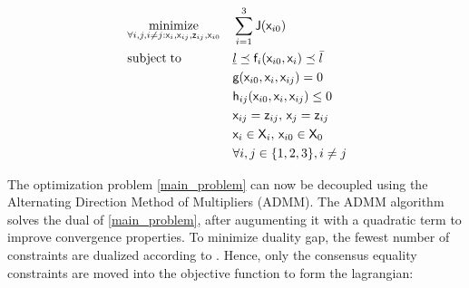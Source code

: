 \documentclass[letterpaper, 10 pt, conference]{ieeeconf}
\newcommand{\ubar}[1]{\text{\b{$#1$}}}
\DeclareMathOperator*{\minimize}{minimize}
\DeclareMathOperator*{\subj}{subject\;to}
\newcommand{\cx}{\textsf{x}}
\newcommand{\cz}{\textsf{z}}
\newcommand{\J}{\textsf{J}}
\newcommand{\cf}{\textsf{f}}
\newcommand{\cg}{\textsf{g}}
\newcommand{\ch}{\textsf{h}}
\newcommand{\X}{\textsf{X}}
\begin{document}
   \begin{equation}
     \label{main_problem}
     \begin{aligned}
       & \minimize_{\forall i,j,i \neq j:\cx_i,\cx_{ij},\cz_{ij},\cx_{i0}} &&  \sum\limits_{i=1}^{3}\J(\cx_{i0}) \\
       & \subj
       && \ubar{l} \preceq \cf_i(\cx_{i0},\cx_i) \preceq \bar{l}\\
       &       && \cg(\cx_{i0},\cx_i,\cx_{ij}) = 0 \\
       &        && \ch_{ij}(\cx_{i0},\cx_i,\cx_{ij}) \leq 0 \\
       &         && \cx_{ij} = \cz_{ij},\, \cx_{j} = \cz_{ij} \\
       &        && \cx_i \in \X_i,\, \cx_{i0} \in \X_0 \\
       &                                && \forall i,j \in \{1,2,3\}, i \neq j
     \end{aligned}
   \end{equation}

  \indent
 The optimization problem \eqref{main_problem} can now be decoupled using the Alternating Direction Method of Multipliers (ADMM). The ADMM algorithm solves the dual of \eqref{main_problem}, after augumenting it with a quadratic term to improve convergence properties. To minimize duality gap, the fewest number of constraints are dualized according to \cite{c8}. Hence, only the consensus equality constraints are moved into the objective function to form the lagrangian:
\end{document}
